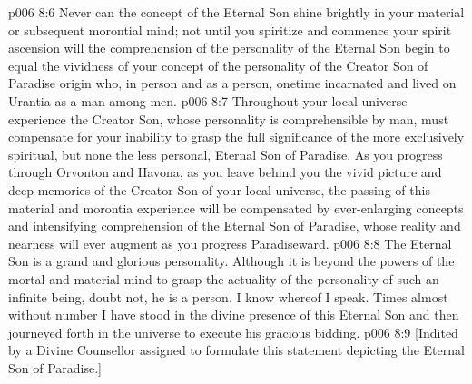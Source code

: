 \vs p006 8:6 Never can the concept of the Eternal Son shine brightly in your material or subsequent morontial mind; not until you spiritize and commence your spirit ascension will the comprehension of the personality of the Eternal Son begin to equal the vividness of your concept of the personality of the Creator Son of Paradise origin who, in person and as a person, onetime incarnated and lived on Urantia as a man among men.
\vs p006 8:7 Throughout your local universe experience the Creator Son, whose personality is comprehensible by man, must compensate for your inability to grasp the full significance of the more exclusively spiritual, but none the less personal, Eternal Son of Paradise. As you progress through Orvonton and Havona, as you leave behind you the vivid picture and deep memories of the Creator Son of your local universe, the passing of this material and morontia experience will be compensated by ever\hyp{}enlarging concepts and intensifying comprehension of the Eternal Son of Paradise, whose reality and nearness will ever augment as you progress Paradiseward.
\vs p006 8:8 \pc The Eternal Son is a grand and glorious personality. Although it is beyond the powers of the mortal and material mind to grasp the actuality of the personality of such an infinite being, doubt not, he is a person. I know whereof I speak. Times almost without number I have stood in the divine presence of this Eternal Son and then journeyed forth in the universe to execute his gracious bidding.
\vsetoff
\vs p006 8:9 [Indited by a Divine Counsellor assigned to formulate this statement depicting the Eternal Son of Paradise.]
\quizlink
